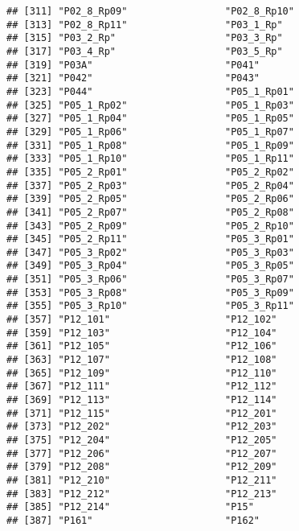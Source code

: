 \documentclass[
]{article}
\begin{document}
\begin{verbatim}
## [311] "P02_8_Rp09"                 "P02_8_Rp10"                
## [313] "P02_8_Rp11"                 "P03_1_Rp"                  
## [315] "P03_2_Rp"                   "P03_3_Rp"                  
## [317] "P03_4_Rp"                   "P03_5_Rp"                  
## [319] "P03A"                       "P041"                      
## [321] "P042"                       "P043"                      
## [323] "P044"                       "P05_1_Rp01"                
## [325] "P05_1_Rp02"                 "P05_1_Rp03"                
## [327] "P05_1_Rp04"                 "P05_1_Rp05"                
## [329] "P05_1_Rp06"                 "P05_1_Rp07"                
## [331] "P05_1_Rp08"                 "P05_1_Rp09"                
## [333] "P05_1_Rp10"                 "P05_1_Rp11"                
## [335] "P05_2_Rp01"                 "P05_2_Rp02"                
## [337] "P05_2_Rp03"                 "P05_2_Rp04"                
## [339] "P05_2_Rp05"                 "P05_2_Rp06"                
## [341] "P05_2_Rp07"                 "P05_2_Rp08"                
## [343] "P05_2_Rp09"                 "P05_2_Rp10"                
## [345] "P05_2_Rp11"                 "P05_3_Rp01"                
## [347] "P05_3_Rp02"                 "P05_3_Rp03"                
## [349] "P05_3_Rp04"                 "P05_3_Rp05"                
## [351] "P05_3_Rp06"                 "P05_3_Rp07"                
## [353] "P05_3_Rp08"                 "P05_3_Rp09"                
## [355] "P05_3_Rp10"                 "P05_3_Rp11"                
## [357] "P12_101"                    "P12_102"                   
## [359] "P12_103"                    "P12_104"                   
## [361] "P12_105"                    "P12_106"                   
## [363] "P12_107"                    "P12_108"                   
## [365] "P12_109"                    "P12_110"                   
## [367] "P12_111"                    "P12_112"                   
## [369] "P12_113"                    "P12_114"                   
## [371] "P12_115"                    "P12_201"                   
## [373] "P12_202"                    "P12_203"                   
## [375] "P12_204"                    "P12_205"                   
## [377] "P12_206"                    "P12_207"                   
## [379] "P12_208"                    "P12_209"                   
## [381] "P12_210"                    "P12_211"                   
## [383] "P12_212"                    "P12_213"                   
## [385] "P12_214"                    "P15"                       
## [387] "P161"                       "P162"                      

\end{verbatim}
\end{document}

